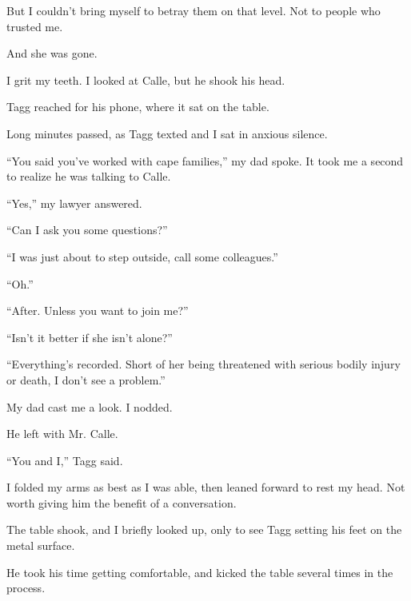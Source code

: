 But I couldn't bring myself to betray them on that level.  Not to people who trusted me.



And she was gone.



I grit my teeth.  I looked at Calle, but he shook his head.



Tagg reached for his phone, where it sat on the table.



Long minutes passed, as Tagg texted and I sat in anxious silence.



``You said you've worked with cape families,'' my dad spoke.  It took me a second to realize he was talking to Calle.



``Yes,'' my lawyer answered.



``Can I ask you some questions?''



``I was just about to step outside, call some colleagues.''



``Oh.''



``After.  Unless you want to join me?''



``Isn't it better if she isn't alone?''



``Everything's recorded.  Short of her being threatened with serious bodily injury or death, I don't see a problem.''



My dad cast me a look.  I nodded.



He left with Mr. Calle.



``You and I,'' Tagg said.



I folded my arms as best as I was able, then leaned forward to rest my head.  Not worth giving him the benefit of a conversation.



The table shook, and I briefly looked up, only to see Tagg setting his feet on the metal surface.



He took his time getting comfortable, and kicked the table several times in the process.



